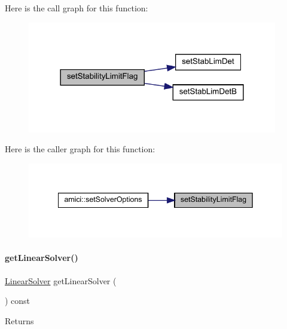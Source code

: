 Here is the call graph for this function\+:
\nopagebreak
\begin{figure}[H]
\begin{center}
\leavevmode
\includegraphics[width=309pt]{classamici_1_1_solver_a618a94f1d84f9c71230d476f9a0205ce_cgraph}
\end{center}
\end{figure}
Here is the caller graph for this function\+:
\nopagebreak
\begin{figure}[H]
\begin{center}
\leavevmode
\includegraphics[width=342pt]{classamici_1_1_solver_a618a94f1d84f9c71230d476f9a0205ce_icgraph}
\end{center}
\end{figure}
\mbox{\label{classamici_1_1_solver_aa5cde2d316aae1d60d6eaf94ce7a854f}} 
\paragraph{\texorpdfstring{getLinearSolver()}{getLinearSolver()}}
{\footnotesize\ttfamily \mbox{\hyperlink{namespaceamici_a1a6a4776314a0843143e5631c3ce21a7}{Linear\+Solver}} get\+Linear\+Solver (\begin{DoxyParamCaption}{ }\end{DoxyParamCaption}) const}

\begin{DoxyReturn}{Returns}

\end{DoxyReturn}


